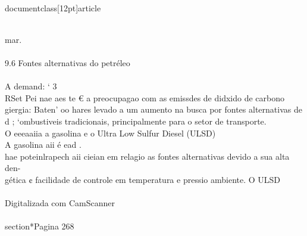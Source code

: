 \\documentclass[12pt]{article}
\begin{document}
{{{{{\\
mar.\\
\\
9.6 Fontes alternativas do petréleo\\
\\
A demand: ‘ 3\\
RSet Pei nae aes te € a preocupagao com as emissdes de didxido de carbono\\
giergia: Baten’ oo hares levado a um aumento na busca por fontes alternativas de\\
d ; ‘ombustiveis tradicionais, principalmente para o setor de transporte.\\
O eeeaaiia a gasolina e o Ultra Low Sulfur Diesel (ULSD)\\
A gasolina aii é ead .\\
hae poteinlrapech aii cieian em relagio as fontes alternativas devido a sua alta den-\\
gética ¢ facilidade de controle em temperatura e pressio ambiente. O ULSD\\
\\
Digitalizada com CamScanner\\

\\section*{Pagina 268}

}}}}}
\end{document}
